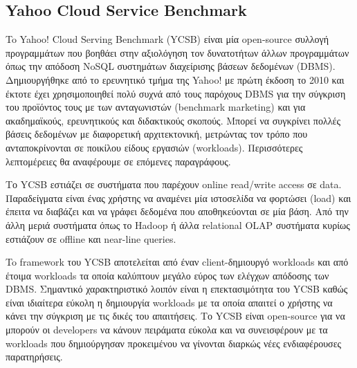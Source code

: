 \documentclass[conference]{IEEEtran}
\begin{document}
\subsection{Yahoo Cloud Service Benchmark}
        To Yahoo! Cloud Serving Benchmark (YCSB) είναι μία open-source συλλογή προγραμμάτων που βοηθάει στην αξιολόγηση τον δυνατοτήτων άλλων προγραμμάτων όπως την απόδοση NoSQL συστημάτων διαχείρισης βάσεων δεδομένων (DBMS). Δημιουργήθηκε από το ερευνητικό τμήμα της Yahoo! με πρώτη έκδοση το 2010 και έκτοτε έχει χρησιμοποιηθεί πολύ συχνά από τους παρόχους DBMS για την σύγκριση του προϊόντος τους με των ανταγωνιστών (benchmark marketing) και για ακαδημαϊκούς, ερευνητικούς και διδακτικούς σκοπούς. Μπορεί να συγκρίνει πολλές βάσεις δεδομένων με διαφορετική αρχιτεκτονική, μετρώντας τον τρόπο που ανταποκρίνονται σε ποικίλου είδους εργασιών (workloads). Περισσότερες λεπτομέρειες θα αναφέρουμε σε επόμενες παραγράφους.
       
        Το YCSB εστιάζει σε συστήματα που παρέχουν online read/write access σε data. Παραδείγματα είναι ένας χρήστης να αναμένει μία ιστοσελίδα να φορτώσει (load) και έπειτα να διαβάζει και να γράφει δεδομένα που αποθηκεύονται σε μία βάση. Από την άλλη μεριά συστήματα όπως το Hadoop ή  άλλα relational OLAP συστήματα κυρίως εστιάζουν σε offline και near-line queries.
	   
        To framework του YCSB αποτελείται από έναν client-δημιουργό workloads και από έτοιμα workloads τα οποία καλύπτουν μεγάλο εύρος των ελέγχων απόδοσης των DBMS. Σημαντικό χαρακτηριστικό λοιπόν είναι η επεκτασιμότητα του YCSB καθώς είναι ιδιαίτερα εύκολη η δημιουργία workloads με τα οποία απαιτεί ο χρήστης να κάνει την σύγκριση με τις δικές του απαιτήσεις. Το YCSB είναι open-source για να μπορούν οι developers να κάνουν πειράματα εύκολα και να συνεισφέρουν με τα workloads που δημιούργησαν προκειμένου να γίνονται διαρκώς νέες ενδιαφέρουσες παρατηρήσεις.
\end{document}
